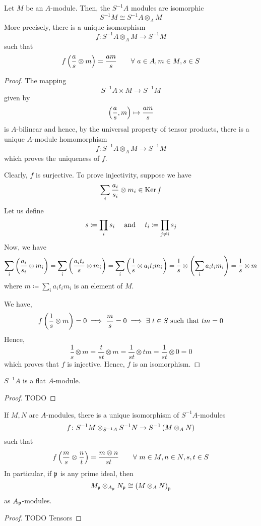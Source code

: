 \begin{proposition}{}{}
	Let \(M\) be an \(A\)-module.
	Then, the \(S^{-1}A\) modules are isomorphic
	\[
		S^{-1}M \cong S^{-1}A \otimes_A M
	\]
	More precisely, there is a unique isomorphism
	\[
		f \colon S^{-1}A \otimes_A M \to S^{-1}M
	\]
	such that
	\[
		f\left( \frac{a}{s} \otimes m \right) = \frac{am}{s}
		\qquad \forall\ a \in A, m \in M, s \in S
	\]
\end{proposition}
\begin{proof}
	The mapping
	\[
		S^{-1}A \times M \to S^{-1}M
	\]
	given by
	\[
		\left( \frac{a}{s}, m \right) \mapsto \frac{am}{s}
	\]
	is \(A\)-bilinear and hence, by the universal property of
	tensor products, there is a unique \(A\)-module homomorphism
	\[
		f \colon S^{-1}A \otimes_A M \to S^{-1}M
	\]
	which proves the uniqueness of \(f\).

	Clearly, \(f\) is surjective.
	To prove injectivity, suppose we have
	\[
		\sum_{i} \frac{a_i}{s_i} \otimes m_i \in \operatorname{Ker} f
	\]
	Let us define
	\[
		s \coloneqq \prod_{i} s_i \quad \text{ and } \quad t_i \coloneqq \prod_{j \neq i} s_j
	\]
	Now, we have
	\[
		\sum_{i} \left( \frac{a_i}{s_i} \otimes m_i \right)
		= \sum_{i} \left( \frac{a_i t_i}{s} \otimes m_i \right)
		= \sum_{i} \left( \frac{1}{s} \otimes a_i t_i m_i \right)
		= \frac{1}{s} \otimes \left( \sum_{i} a_i t_i m_i \right)
		= \frac{1}{s} \otimes m
	\]
	where \(m \coloneqq \sum_{i} a_i t_i m_i\) is an element of \(M\).

	We have,
	\[
		f\left( \frac{1}{s} \otimes m \right) = 0 \implies \frac{m}{s} = 0
		\implies \exists\ t \in S \text{ such that } tm = 0
	\]
	Hence,
	\[
		\frac{1}{s} \otimes m = \frac{t}{st} \otimes m
		= \frac{1}{st} \otimes tm = \frac{1}{st} \otimes 0 = 0
	\]
	which proves that \(f\) is injective.
	Hence, \(f\) is an isomorphism.
\end{proof}


\begin{corollary}{}{}
	\(S^{-1}A\) is a flat \(A\)-module.
\end{corollary}
\begin{proof}
	TODO %
\end{proof}


\begin{proposition}{}{}
	If \(M, N\) are \(A\)-modules, there is a unique isomorphism
	of \(S^{-1}A\)-modules
	\[
		f \colon S^{-1}M \otimes_{S^{-1}A} S^{-1}N
		\to S^{-1}\left( M \otimes_A N \right)
	\]
	such that
	\[
		f\left( \frac{m}{s} \otimes \frac{n}{t} \right) =
		\frac{m \otimes n}{st} \qquad \forall\ m \in M, n \in N, s, t \in S
	\]
	In particular, if \(\mathfrak{p}\) is any prime ideal, then
	\[
		M_{\mathfrak{p}} \otimes_{A_{\mathfrak{p}}} N_{\mathfrak{p}} \cong
		\left( M \otimes_A N \right)_{\mathfrak{p}}
	\]
	as \(A_{\mathfrak{p}}\)-modules.
\end{proposition}
\begin{proof}
	TODO Tensors %
\end{proof}


